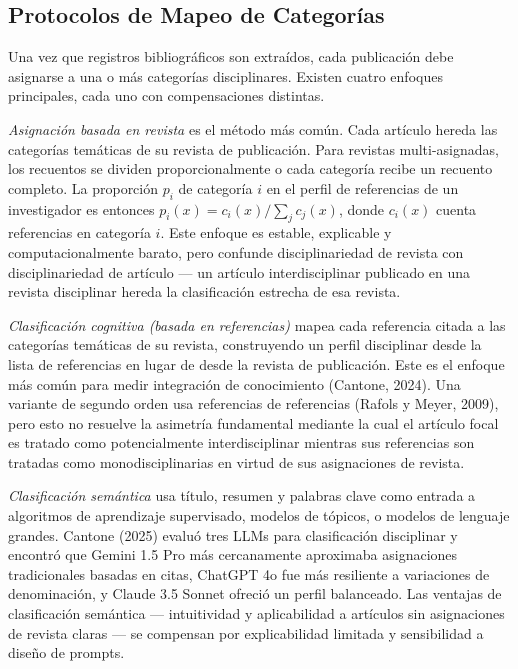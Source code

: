 \documentclass[
]{article}
\begin{document}
\hypertarget{protocolos-de-mapeo-de-categoruxedas}{%
\subsection{Protocolos de Mapeo de
Categorías}\label{protocolos-de-mapeo-de-categoruxedas}}

Una vez que registros bibliográficos son extraídos, cada publicación
debe asignarse a una o más categorías disciplinares. Existen cuatro
enfoques principales, cada uno con compensaciones distintas.

\emph{Asignación basada en revista} es el método más común. Cada
artículo hereda las categorías temáticas de su revista de publicación.
Para revistas multi-asignadas, los recuentos se dividen
proporcionalmente o cada categoría recibe un recuento completo. La
proporción \(p_i\) de categoría \(i\) en el perfil de referencias de un
investigador es entonces \(p_i(x) = c_i(x) / \sum_j c_j(x)\), donde
\(c_i(x)\) cuenta referencias en categoría \(i\). Este enfoque es
estable, explicable y computacionalmente barato, pero confunde
disciplinariedad de revista con disciplinariedad de artículo --- un
artículo interdisciplinar publicado en una revista disciplinar hereda la
clasificación estrecha de esa revista.

\emph{Clasificación cognitiva (basada en referencias)} mapea cada
referencia citada a las categorías temáticas de su revista, construyendo
un perfil disciplinar desde la lista de referencias en lugar de desde la
revista de publicación. Este es el enfoque más común para medir
integración de conocimiento (Cantone, 2024). Una variante de segundo
orden usa referencias de referencias (Rafols y Meyer, 2009), pero esto
no resuelve la asimetría fundamental mediante la cual el artículo focal
es tratado como potencialmente interdisciplinar mientras sus referencias
son tratadas como monodisciplinarias en virtud de sus asignaciones de
revista.

\emph{Clasificación semántica} usa título, resumen y palabras clave como
entrada a algoritmos de aprendizaje supervisado, modelos de tópicos, o
modelos de lenguaje grandes. Cantone (2025) evaluó tres LLMs para
clasificación disciplinar y encontró que Gemini 1.5 Pro más cercanamente
aproximaba asignaciones tradicionales basadas en citas, ChatGPT 4o fue
más resiliente a variaciones de denominación, y Claude 3.5 Sonnet
ofreció un perfil balanceado. Las ventajas de clasificación semántica
--- intuitividad y aplicabilidad a artículos sin asignaciones de revista
claras --- se compensan por explicabilidad limitada y sensibilidad a
diseño de prompts.
\end{document}
